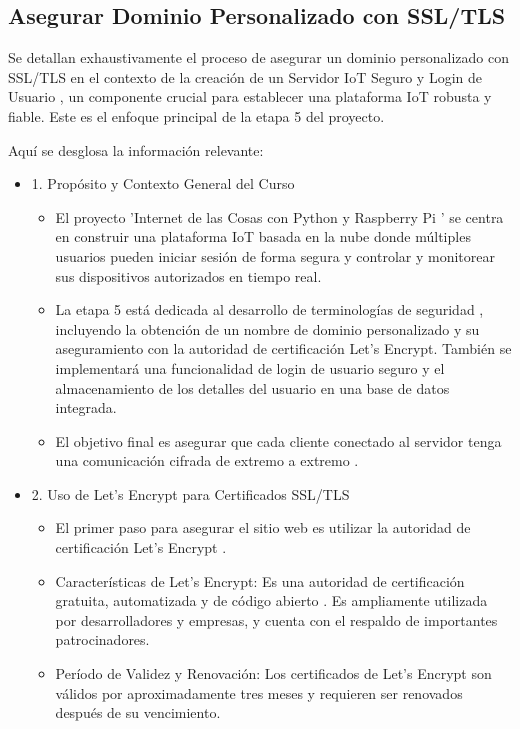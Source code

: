 \documentclass{report}
\begin{document}
\subsection{Asegurar Dominio Personalizado con SSL/TLS}
Se detallan exhaustivamente el proceso de  asegurar un dominio personalizado con SSL/TLS  en el contexto de la creación de un  Servidor IoT 
Seguro y Login de Usuario , un componente crucial para establecer una plataforma IoT robusta y fiable. Este es el enfoque principal de la etapa 5 
del proyecto.

Aquí se desglosa la información relevante:
\begin{itemize}
    \item 1. Propósito y Contexto General del Curso
    \begin{itemize}
        \item El proyecto  'Internet de las Cosas con Python y Raspberry Pi ' se centra en construir una  plataforma IoT basada en la nube  donde 
        múltiples usuarios pueden iniciar sesión de forma segura y controlar y monitorear sus dispositivos autorizados en tiempo real.
        \item La etapa 5 está dedicada al  desarrollo de terminologías de seguridad , incluyendo la obtención de un nombre de dominio personalizado 
        y su aseguramiento con la autoridad de certificación Let's Encrypt. También se implementará una funcionalidad de login de usuario seguro y el 
        almacenamiento de los detalles del usuario en una base de datos integrada.
        \item El objetivo final es asegurar que cada cliente conectado al servidor tenga una  comunicación cifrada de extremo a extremo .
    \end{itemize}

    \item 2. Uso de Let's Encrypt para Certificados SSL/TLS
    \begin{itemize}
        \item El primer paso para asegurar el sitio web es utilizar la  autoridad de certificación Let's Encrypt .
        \item Características de Let's Encrypt: Es una autoridad de certificación  gratuita, automatizada y de código abierto . Es ampliamente 
        utilizada por desarrolladores y empresas, y cuenta con el respaldo de importantes patrocinadores.
        \item Período de Validez y Renovación: Los certificados de Let's Encrypt son  válidos por aproximadamente tres meses  y requieren ser 
        renovados después de su vencimiento.
    \end{itemize}


\end{itemize}
\end{document}
